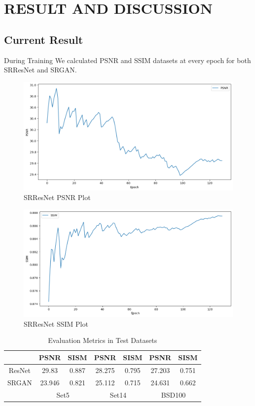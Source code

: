 \newpage
\section{RESULT AND DISCUSSION}
\subsection{Current Result}
During Training We calculated PSNR and SSIM datasets at every epoch for both SRResNet and SRGAN.
\begin{figure}[h]
    \centering
    \includegraphics[width=5.5in]{./figures/srresnet_psnr.png}
    \caption{SRResNet PSNR Plot}
\end{figure}
\begin{figure}[ht]
    \centering
    \includegraphics[width=5.5in]{./figures/srresnnet_ssim.png}
    \caption{SRResNet SSIM Plot}
\end{figure}  
\begin{table}[h]
    \centering
    \begin{tabular}{|c|c|c|c|c|c|c|}
    \hline
    &PSNR & SISM & PSNR & SISM & PSNR & SISM \\
    \hline
    ResNet&29.83 & 0.887 & 28.275 & 0.795 & 27.203 & 0.751 \\
    \hline
    SRGAN &23.946 & 0.821 &25.112 & 0.715 & 24.631 & 0.662 \\
    \hline
    & \multicolumn{2}{|c|}{Set5}& \multicolumn{2}{|c|}{Set14} & \multicolumn{2}{|c|}{BSD100} \\
    \hline
    \end{tabular}
    \caption{Evaluation Metrics in Test Datasets}
\end{table}
